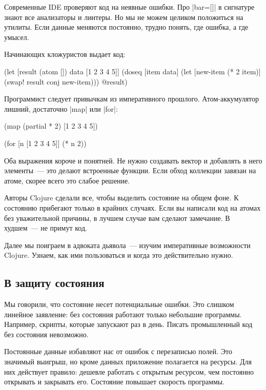 Современные IDE проверяют код на неявные ошибки. Про \spverb|bar=[]| в сигнатуре
знают все анализаторы и линтеры. Но мы не можем целиком положиться на
утилиты. Если данные меняются постоянно, трудно понять, где ошибка, а где
умысел.

Начинающих кложуристов выдает код:

\begin{english}
  \begin{clojure}
(let [result (atom [])
      data [1 2 3 4 5]]
  (doseq [item data]
    (let [new-item (* 2 item)]
      (swap! result conj new-item)))
  @result)
  \end{clojure}
\end{english}

\noindent
Программист следует привычкам из императивного прошлого. Атом-аккумулятор
лишний, достаточно \spverb|map| или \spverb|for|:

\begin{english}
  \begin{clojure}
(map (partial * 2) [1 2 3 4 5])

(for [n [1 2 3 4 5]]
  (* n 2))
  \end{clojure}
\end{english}

Оба выражения короче и понятней. Не нужно создавать вектор и добавлять в него
элементы~--- это делают встроенные функции. Если обход коллекции завязан на
атоме, скорее всего это слабое решение.

Авторы Clojure сделали все, чтобы выделить состояние на общем фоне. К состоянию
прибегают только в крайних случаях. Если вы написали код на атомах без
уважительной причины, в лучшем случае вам сделают замечание. В худшем~--- не
примут код.

Далее мы поиграем в адвоката дьявола~--- изучим императивные возможности
Clojure. Узнаем, как ими пользоваться и когда это действительно нужно.

\subsection{В защиту состояния}

Мы говорили, что состояние несет потенциальные ошибки. Это слишком линейное
заявление: без состояния работают только небольшие программы. Например, скрипты,
которые запускают раз в день. Писать промышленный код без состояния невозможно.

Постоянные данные избавляют нас от ошибок с перезаписью полей. Это значимый
выигрыш, но кроме данных приложение полагается на ресурсы. Для них действует
правило: дешевле работать с открытым ресурсом, чем постоянно открывать и
закрывать его. Состояние повышает скорость программы.

